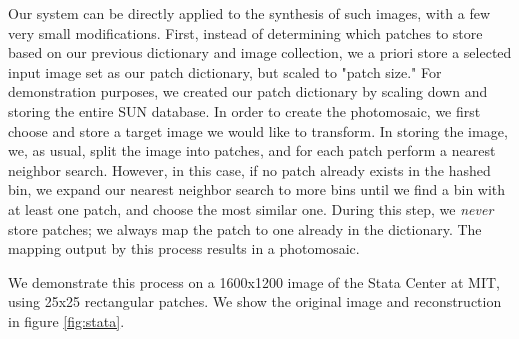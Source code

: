 Our system can be directly applied to the synthesis of such images, with a few very small modifications.  First, instead of determining which patches to store based on our previous dictionary and image collection, we a priori store a selected input image set as our patch dictionary, but scaled to "patch size."  For demonstration purposes, we created our patch dictionary by scaling down and storing the entire SUN database.  In order to create the photomosaic, we first choose and store a target image we would like to transform.  In storing the image, we, as usual, split the image into patches, and for each patch perform a nearest neighbor search.  However, in this case, if no patch already exists in the hashed bin, we expand our nearest neighbor search to more bins until we find a bin with at least one patch, and choose the most similar one.  During this step, we \emph{never} store patches; we always map the patch to one already in the dictionary.  The mapping output by this process results in a photomosaic.

We demonstrate this process on a 1600x1200 image of the Stata Center at MIT, using 25x25 rectangular patches.  We show the original image and reconstruction in figure \ref{fig:stata}.


